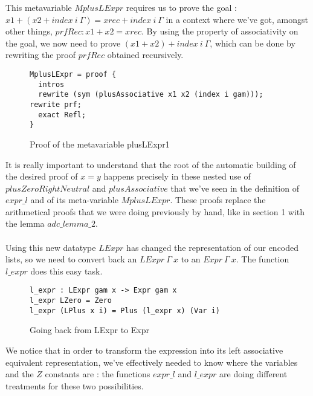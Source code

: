 This metavariable $MplusLExpr$ requires us to prove the goal : $x1 + (x2 + index\ i\ \Gamma) = xrec + index\ i\ \Gamma$ in a context where we've got, amongst other things, $prfRec : x1 + x2 = xrec$.
By using the property of associativity on the goal, we now need to prove $(x1 + x2) + index\ i\ \Gamma$, which can be done by rewriting the proof $prfRec$ obtained recursively.

\begin{figure}[H]
\figrule
\begin{center}
\begin{verbatim}
MplusLExpr = proof {
  intros
  rewrite (sym (plusAssociative x1 x2 (index i gam))); rewrite prf; 
  exact Refl;
}
\end{verbatim}
\end{center}
\caption{Proof of the metavariable plusLExpr1}
\figrule
\end{figure}

It is really important to understand that the root of the automatic building of the desired proof of $x=y$ happens precisely in these nested use of $plusZeroRightNeutral$ and $plusAssociative$ that we've seen in the definition of $expr\_l$ and of its meta-variable $MplusLExpr$. These proofs replace the arithmetical proofs that we were doing previously by hand, like in section 1 with the lemma $adc\_lemma\_2$. \\
\\
Using this new datatype $LExpr$ has changed the representation of our encoded lists, so we need to convert back an $LExpr\ \Gamma\ x$ to an $Expr\ \Gamma\ x$. The function $l\_expr$ does this easy task.
\begin{figure}[H]
\figrule
\begin{center}
\begin{verbatim}
l_expr : LExpr gam x -> Expr gam x
l_expr LZero = Zero
l_expr (LPlus x i) = Plus (l_expr x) (Var i)
\end{verbatim}
\end{center}
\caption{Going back from LExpr to Expr}
\figrule
\end{figure}


We notice that in order to transform the expression into its left associative equivalent representation, we've effectively needed to know where the variables and the $Z$ constants are : the functions $expr\_l$ and $l\_expr$ are doing different treatments for these two possibilities. \\
\\

